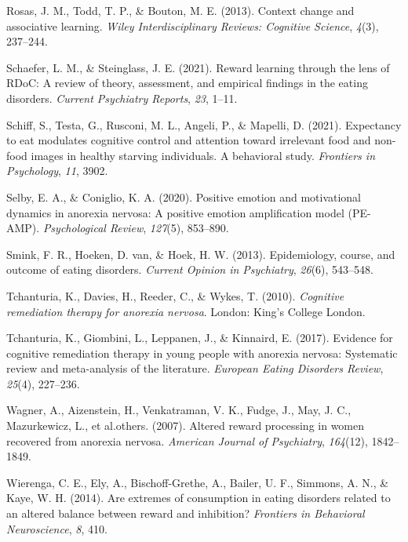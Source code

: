 \documentclass[
  man,floatsintext]{apa6}
\newlength{\cslhangindent}
\newlength{\cslentryspacingunit} %
\newenvironment{CSLReferences}[2] %
 {%
  \setlength{\parindent}{0pt}
  \ifodd #1
  \let\oldpar\par
  \def\par{\hangindent=\cslhangindent\oldpar}
  \fi
  \setlength{\parskip}{#2\cslentryspacingunit}
 }%
 {}
\begin{document}
\begin{CSLReferences}{1}{0}
\leavevmode{}%
Rosas, J. M., Todd, T. P., \& Bouton, M. E. (2013). Context change and associative learning. \emph{Wiley Interdisciplinary Reviews: Cognitive Science}, \emph{4}(3), 237--244.

\leavevmode{}%
Schaefer, L. M., \& Steinglass, J. E. (2021). Reward learning through the lens of RDoC: A review of theory, assessment, and empirical findings in the eating disorders. \emph{Current Psychiatry Reports}, \emph{23}, 1--11.

\leavevmode{}%
Schiff, S., Testa, G., Rusconi, M. L., Angeli, P., \& Mapelli, D. (2021). Expectancy to eat modulates cognitive control and attention toward irrelevant food and non-food images in healthy starving individuals. A behavioral study. \emph{Frontiers in Psychology}, \emph{11}, 3902.

\leavevmode{}%
Selby, E. A., \& Coniglio, K. A. (2020). Positive emotion and motivational dynamics in anorexia nervosa: A positive emotion amplification model (PE-AMP). \emph{Psychological Review}, \emph{127}(5), 853--890.

\leavevmode{}%
Smink, F. R., Hoeken, D. van, \& Hoek, H. W. (2013). Epidemiology, course, and outcome of eating disorders. \emph{Current Opinion in Psychiatry}, \emph{26}(6), 543--548.

\leavevmode{}%
Tchanturia, K., Davies, H., Reeder, C., \& Wykes, T. (2010). \emph{Cognitive remediation therapy for anorexia nervosa}. London: King's College London.

\leavevmode{}%
Tchanturia, K., Giombini, L., Leppanen, J., \& Kinnaird, E. (2017). Evidence for cognitive remediation therapy in young people with anorexia nervosa: Systematic review and meta-analysis of the literature. \emph{European Eating Disorders Review}, \emph{25}(4), 227--236.

\leavevmode{}%
Wagner, A., Aizenstein, H., Venkatraman, V. K., Fudge, J., May, J. C., Mazurkewicz, L., et al.others. (2007). Altered reward processing in women recovered from anorexia nervosa. \emph{American Journal of Psychiatry}, \emph{164}(12), 1842--1849.

\leavevmode{}%
Wierenga, C. E., Ely, A., Bischoff-Grethe, A., Bailer, U. F., Simmons, A. N., \& Kaye, W. H. (2014). Are extremes of consumption in eating disorders related to an altered balance between reward and inhibition? \emph{Frontiers in Behavioral Neuroscience}, \emph{8}, 410.


\end{CSLReferences}
\end{document}
